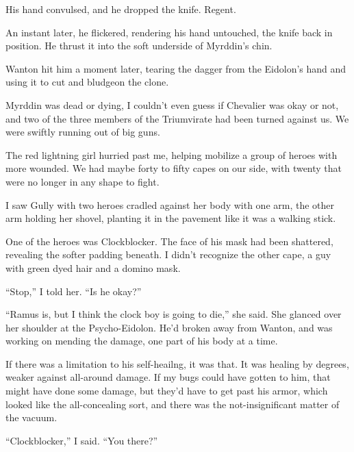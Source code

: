 His hand convulsed, and he dropped the knife.  Regent.



An instant later, he flickered, rendering his hand untouched, the knife back in position.  He thrust it into the soft underside of Myrddin's chin.



Wanton hit him a moment later, tearing the dagger from the Eidolon's hand and using it to cut and bludgeon the clone.



Myrddin was dead or dying, I couldn't even guess if Chevalier was okay or not, and two of the three members of the Triumvirate had been turned against us.  We were swiftly running out of big guns.



The red lightning girl hurried past me, helping mobilize a group of heroes with more wounded.  We had maybe forty to fifty capes on our side, with twenty that were no longer in any shape to fight.



I saw Gully with two heroes cradled against her body with one arm, the other arm holding her shovel, planting it in the pavement like it was a walking stick.



One of the heroes was Clockblocker.  The face of his mask had been shattered, revealing the softer padding beneath.  I didn't recognize the other cape, a guy with green dyed hair and a domino mask.



``Stop,'' I told her.  ``Is he okay?''



``Ramus is, but I think the clock boy is going to die,'' she said.  She glanced over her shoulder at the Psycho-Eidolon.  He'd broken away from Wanton, and was working on mending the damage, one part of his body at a time.



If there was a limitation to his self-heailng, it was that.  It was healing by degrees, weaker against all-around damage.  If my bugs could have gotten to him, that might have done some damage, but they'd have to get past his armor, which looked like the all-concealing sort, and there was the not-insignificant matter of the vacuum.



``Clockblocker,'' I said.  ``You there?''



